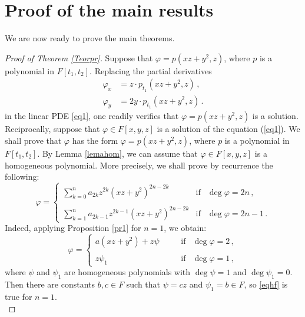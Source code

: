 \documentclass{amsart}
\begin{document}
\section{Proof of the main results}
\label{sectproofs}

We are now ready to prove the main theorems. 

\begin{proof}[Proof of Theorem \ref{Teorpr}]
	Suppose that $\varphi=p(xz+y^2,z)$, where $p$ is a polynomial in $F[t_1,t_2]$. Replacing the partial derivatives 
	\begin{align*}
		\varphi_x&= z\cdot p_{t_1}(xz+y^2,z)\,,\\  
		\varphi_y&= 2y\cdot p_{t_1}(xz+y^2,z)\,.
	\end{align*}
	in the linear PDE \eqref{eq1}, one readily verifies that $\varphi=p(xz+y^2,z)$ is a solution. Reciprocally, suppose that $\varphi\in F[x,y,z]$ is a solution of the equation  (\ref{eq1}). We shall prove that $\varphi$ has the form  $\varphi=p(xz+y^2,z)$, where $p$ is a polynomial in $F[t_1,t_2]$. By Lemma \ref{lemahom}, we can assume that $\varphi\in F[x,y,z]$ is a homogeneous polynomial. More precisely, we shall prove by recurrence the following: 
	\begin{equation}\label{eqhf}
		\varphi=\left\{ \begin{array}{rcl}
			\sum_{k=0}^{n}a_{2k}z^{2k}(xz+y^2)^{2n-2k}\,\,\,\,\,\,\,\,\,\,\,& \mbox{if} & \deg \varphi=2n\,,\\
			& & \\
			\sum_{k=1}^{n}a_{2k-1}z^{2k-1}(xz+y^2)^{2n-2k} & \mbox{if} & \deg \varphi=2n-1\,.
		\end{array}
		\right. 
	\end{equation}
	Indeed, applying Proposition \ref{pr1} for $n=1$, we obtain:
	\begin{equation*}
		\varphi=\left\{ \begin{array}{ccl}
			a(xz+y^2)+z\psi\,\,\,\,\,\,\,\,\,\,\,& \mbox{if} & \deg \varphi=2\,,\\
			& & \\
			z\psi_1  & \mbox{if} & \deg \varphi=1\,,
		\end{array}
		\right. 
	\end{equation*}
	where $\psi$ and $\psi_1$ are homogeneous polynomials with $\deg \psi=1$ and $\deg\psi_1=0$. Then there are constants $b,c\in F$ such that  $\psi=cz$ and $\psi_1=b\in F$, so \eqref{eqhf} is true for $n=1$.\\

\end{proof}
\end{document}
